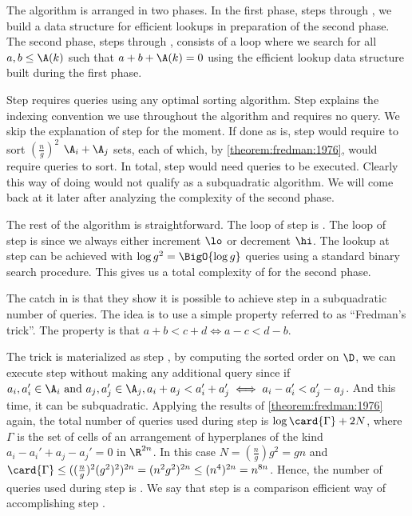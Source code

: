 The algorithm is arranged in two phases. In the first phase, steps 
through , we build a data structure
for efficient lookups in preparation of the second phase. The second phase, steps
 through , consists of a loop where we search
for all $a, b \le \A(k)$ such that $a + b + \A(k) = 0$ using the efficient lookup
data structure built during the first phase.

Step  requires  queries using any optimal sorting
algorithm. Step  explains
the indexing convention we use throughout the algorithm and requires no query.
We skip the explanation of step  for the moment. If done as is,
step  would require to sort $(\frac{n}{g})^2$ $\A_i + \A_j$ sets,
each of which, by \ref{theorem:fredman:1976}, would require  queries
to sort. In total, step  would need  queries to be
executed. Clearly this way of doing would not qualify as a subquadratic
algorithm. We will come back at it later after analyzing the complexity of the
second phase.

The rest of the algorithm is straightforward. The loop of step  is
. The loop of step  is  since we
always either increment $\lo$ or decrement $\hi$. The lookup at step
 can be achieved with $\log g^2 = \BigO{\log g}$ queries using
a standard binary search procedure. This gives us a total complexity of
 for the second phase.

The catch in \citet*{gronlund:2014} is that they show it is possible to
achieve step  in a subquadratic number of queries. The idea is to use a simple property referred to as ``Fredman's
trick''. The property is that $a + b < c + d \iff a - c < d - b$.

The trick is materialized as step , by computing the sorted
order on $\D$, we can execute step  without making any additional
query since if $a_i, a_i' \in \A_i \text{ and } a_j, a_j' \in \A_j, a_i + a_j <
a_i' + a_j' \iff a_i - a_i' < a_j' - a_j$. And this time, it can be
subquadratic. Applying the results of \ref{theorem:fredman:1976} again, the
total number of queries used during step  is $\log \card{\Gamma} + 2N$,
where \(\Gamma\) is the set of cells of an arrangement of hyperplanes of the
kind \( a_i - a_i' + a_j - a_j' = 0 \) in \(\R^{2n}\).
In this case $N = (\frac{n}{g}) g^2 = gn$ and $\card{\Gamma} \le
((\frac{n}{g})^2 (g^2)^2)^{2n} = (n^2 g^2)^{2n} \le (n^4)^{2n} = n^{8n}$.
Hence, the number of queries used during step  is .
We say that step  is a comparison efficient way of accomplishing step
.

